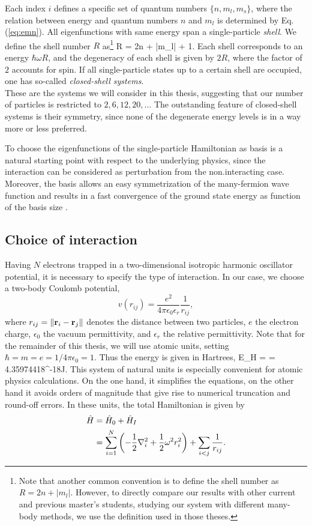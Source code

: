 Each index $i$ defines a specific set of quantum numbers $\lbrace n,m_l,m_s\rbrace$, where the relation between energy and quantum numbers $n$ and $m_l$ is determined by Eq. (\ref{eq:emn}). All eigenfunctions with same energy span a single-particle \textit{shell}. We define the shell number $R$ as\footnote{Note that another common convention is to define the shell number as $R=2n + |m_l|$. However, to directly compare our results with other current and previous master's students, studying our system with different many-body methods, we use the definition used in those theses.}
\be 
R = 2n + |m_l| + 1.
\ee
Each shell corresponds to an energy $\hbar\omega R$, and the degeneracy of each shell is given by $2R$, where the factor of $2$ accounts for spin.  If all single-particle states up to a certain shell are occupied, one has so-called \textit{closed-shell systems}.\\
These are the systems  we will consider in this thesis, suggesting that our number of particles is  restricted to $2,6,12,20,\dots$ The outstanding feature of closed-shell systems is their symmetry, since none of the degenerate energy levels is in a way more or less preferred.

To choose the eigenfunctions of the single-particle Hamiltonian as basis is a natural starting point with respect to the underlying physics, since the interaction can be considered as perturbation from the non.interacting case. Moreover, the basis allows an easy symmetrization of the many-fermion wave function and results in a fast convergence of the ground state energy as function of the basis size \cite{rontani:124102}.

\subsection{Choice of interaction}
Having $N$ electrons trapped in a two-dimensional isotropic harmonic oscillator potential, it is necessary to specify the type of interaction. In our case, we choose a two-body Coulomb potential,
\[
v(r_{ij}) = \frac{e^2}{4\pi\epsilon_0\epsilon_r}\frac{1}{r_{ij}},
\]
where $r_{ij} = \Vert \mathbf{r}_i - \mathbf{r}_j \Vert$ denotes the distance between two particles, $e$ the electron charge, $\epsilon_0$ the vacuum permittivity, and $\epsilon_r$ the relative permittivity.  Note that for the remainder of this thesis, we will use atomic units, setting $\hbar = m = e = 1/4\pi\epsilon_0 = 1$. Thus the energy is given in Hartrees,
\be 
E_H =  = 4.35974418^{-18}J.
\ee 
This system of natural units is especially convenient for atomic physics calculations. On the one hand, it simplifies the equations, on the other hand it avoids orders of magnitude that give rise to numerical truncation and round-off errors.
In these units, the total Hamiltonian is  given by
\begin{align}
\hat H &= \hat H_0 + \hat H_I \notag \\
&= \sum_{i=1}^N \left(-\frac{1}{2}\nabla_i^2 + \frac{1}{2} \omega^2r_i^2\right) + \sum_{i<j} \frac{1}{r_{ij}}.
\label{eq:QDotH}
\end{align}


